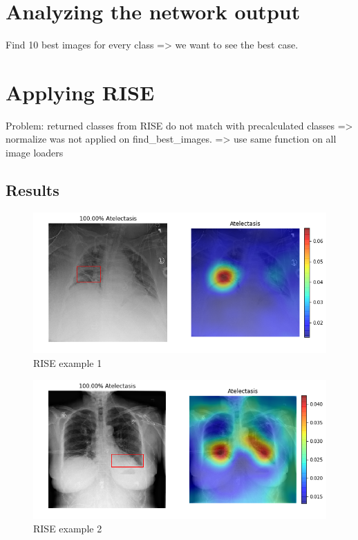 \section{Analyzing the network output}
Find 10 best images for every class => we want to see the best case.



\section{Applying RISE}
Problem: returned classes from RISE do not match with precalculated classes
=> normalize was not applied on find\_best\_images.
=> use same function on all image loaders


\subsection{Results}
\begin{figure}[h]
\centering
\caption{RISE example 1}
\includegraphics[width=12cm]{chapters/03_classification/images/rise_0.png}
\end{figure}

\begin{figure}[h]
\centering
\caption{RISE example 2}
\includegraphics[width=12cm]{chapters/03_classification/images/rise_2.png}
\end{figure}

